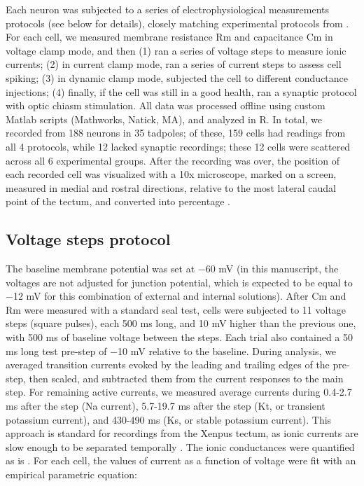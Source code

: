 \documentclass{article}
\begin{document}
Each neuron was subjected to a series of electrophysiological measurements protocols (see below for details), closely matching experimental protocols from \citep{ciarleglio2015}. For each cell, we measured membrane resistance Rm and capacitance Cm in voltage clamp mode, and then (1) ran a series of voltage steps to measure ionic currents; (2) in current clamp mode, ran a series of current steps to assess cell spiking; (3) in dynamic clamp mode, subjected the cell to different conductance injections; (4) finally, if the cell was still in a good health, ran a synaptic protocol with optic chiasm stimulation. All data was processed offline using custom Matlab scripts (Mathworks, Natick, MA), and analyzed in R. In total, we recorded from 188 neurons in 35 tadpoles; of these, 159 cells had readings from all 4 protocols, while 12 lacked synaptic recordings; these 12 cells were scattered across all 6 experimental groups. After the recording was over, the position of each recorded cell was visualized with a 10x microscope, marked on a screen, measured in medial and rostral directions, relative to the most lateral caudal point of the tectum, and converted into percentage \citep{hamodi2014}.

\subsection*{Voltage steps protocol}

The baseline membrane potential was set at $-$60 mV (in this manuscript, the voltages are not adjusted for junction potential, which is expected to be equal to $-$12 mV for this combination of external and internal solutions). After Cm and Rm were measured with a standard seal test, cells were subjected to 11 voltage steps (square pulses), each 500 ms long, and 10 mV higher than the previous one, with 500 ms of baseline voltage between the steps. Each trial also contained a 50 ms long test pre-step of $-$10 mV relative to the baseline. During analysis, we averaged transition currents evoked by the leading and trailing edges of the pre-step, then scaled, and subtracted them from the current responses to the main step. For remaining active currents, we measured average currents during 0.4-2.7 ms after the step (Na current), 5.7-19.7 ms after the step (Kt, or transient potassium current), and 430-490 ms (Ks, or stable potassium current). This approach is standard for recordings from the Xenpus tectum, as ionic currents are slow enough to be separated temporally \citep{aizenman2003}. The ionic conductances were quantified as is \citep{ciarleglio2015}. For each cell, the values of current as a function of voltage were fit with an empirical parametric equation:
\end{document}
